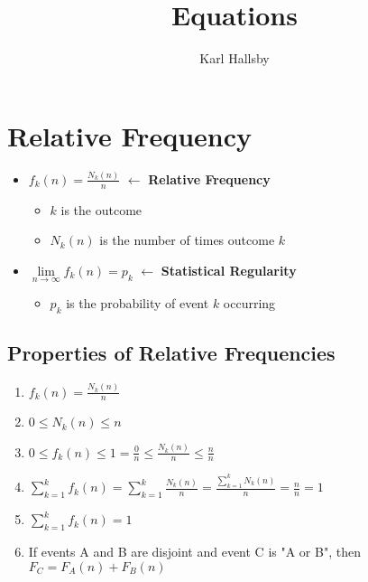\documentclass[10pt,letterpaper,final,twoside,notitlepage]{article}
\author{Karl Hallsby}
\title{Equations}
\begin{document}
\section{Relative Frequency} \label{sec:Relative Frequency}
\begin{itemize}[noitemsep, nolistsep]
	\item $f_k (n) = \frac{N_k (n)}{n}$ $\leftarrow$ {\large \textbf{Relative Frequency}}
	\begin{itemize}[noitemsep, nolistsep]
		\item $k$ is the outcome
		\item $N_k (n)$ is the number of times outcome $k$
	\end{itemize}
	\item $\lim\limits_{n \rightarrow \infty} f_k (n) = p_k$ $\leftarrow$ {\large \textbf{Statistical Regularity}}
	\begin{itemize}[noitemsep, nolistsep]
		\item $p_k$ is the probability of event $k$ occurring
	\end{itemize}
\end{itemize}

	\subsection{Properties of Relative Frequencies} \label {subsec:Properties Relative Frequency}
	\begin{enumerate}
		\item $f_k (n) = \frac{N_k (n)}{n}$
		\item $0 \leq N_k (n) \leq n$
		\item $0 \leq f_k (n) \leq 1 = \frac{0}{n} \leq \frac{N_k (n)}{n} \leq \frac{n}{n}$
		\item $\sum_{k=1}^{k} f_k (n) = \sum_{k=1}^{k} \frac{N_k (n)}{n} = \frac{\sum_{k=1}^{k} N_k (n)}{n} = \frac{n}{n} = 1$
		\item $\sum_{k=1}^{k} f_k (n) = 1$
		\item If events A and B are disjoint and event C is "A or B", then $F_C = F_A (n) + F_B (n)$
	\end{enumerate}
\end{document}
